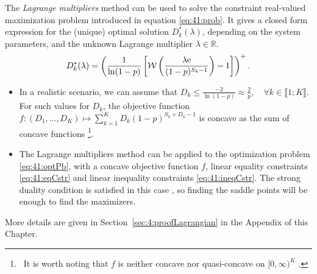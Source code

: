 \begin{proposition}\label{prop:41:Lagrangian}
\begin{leftbar}[propositionbar]  %
    The \emph{Lagrange multipliers} method \cite{BoydVanderberghe04} can be used to solve the constraint real-valued maximization problem introduced in equation \eqref{eq:41:prob}.
    It gives a closed form expression for the (unique) optimal solution $D_k^*(\lambda)$, depending on the system parameters, and the unknown Lagrange multiplier $\lambda \in \mathbb{R}$.
    \begin{equation}\label{eq:41:Dilambda}
        D_k^*(\lambda) = \left(\frac{1}{\ln(1-p)}\left[ \mathcal{W}\left(\frac{\lambda \mathrm{e}}{(1-p)^{S_k-1}} \right)-1 \right]\right)^{+} .
    \end{equation}
\end{leftbar}  %
\end{proposition}
%
\begin{smallproof}
\begin{itemize}
    \item
    In a realistic scenario, we can assume that $D_k\leq \frac{-2}{\ln\left(1-p\right)} \approx \frac{2}{p},\quad \forall k\in\llbracket 1;K \rrbracket$. For such values for $D_k$, the objective function $f: (D_1, \dots, D_{K}) \mapsto \sum_{k=1}^{K} D_k (1 - p)^{S_k + D_k -1}$ is concave as the sum of concave functions
    \footnote{~It is worth noting that $f$ is neither concave nor quasi-concave on $[0,\infty)^{K}$ \cite{Luenberger68,Yaari77}.}.
    \item
    The Lagrange multipliers method can be applied to the optimization problem \eqref{eq:41:optPb}, with a concave objective function $f$, linear equality constraints \eqref{eq:41:eqCstr} and linear inequality constraints \eqref{eq:41:ineqCstr}. The strong duality condition is satisfied in this case \cite{BoydVanderberghe04}, so finding the saddle points will be enough to find the maximizers.
    \end{itemize}
    More details are given in Section~\ref{sec:4:proofLagrangian} in the Appendix of this Chapter.
\end{smallproof}

